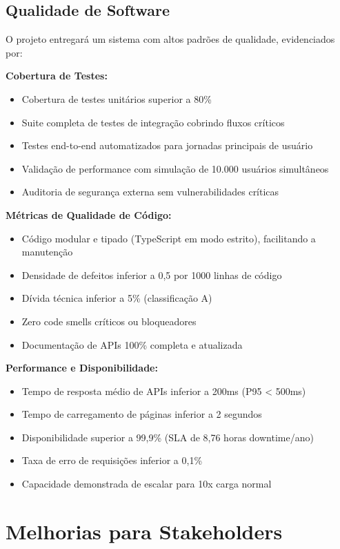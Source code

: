\subsection{Qualidade de Software}

O projeto entregará um sistema com altos padrões de qualidade, evidenciados por:

\textbf{Cobertura de Testes:}
\begin{itemize}
    \item Cobertura de testes unitários superior a 80\%
    \item Suite completa de testes de integração cobrindo fluxos críticos
    \item Testes end-to-end automatizados para jornadas principais de usuário
    \item Validação de performance com simulação de 10.000 usuários simultâneos
    \item Auditoria de segurança externa sem vulnerabilidades críticas
\end{itemize}

\textbf{Métricas de Qualidade de Código:}
\begin{itemize}
    \item Código modular e tipado (TypeScript em modo estrito), facilitando a manutenção
    \item Densidade de defeitos inferior a 0,5 por 1000 linhas de código
    \item Dívida técnica inferior a 5\% (classificação A)
    \item Zero code smells críticos ou bloqueadores
    \item Documentação de APIs 100\% completa e atualizada
\end{itemize}

\textbf{Performance e Disponibilidade:}
\begin{itemize}
    \item Tempo de resposta médio de APIs inferior a 200ms (P95 < 500ms)
    \item Tempo de carregamento de páginas inferior a 2 segundos
    \item Disponibilidade superior a 99,9\% (SLA de 8,76 horas downtime/ano)
    \item Taxa de erro de requisições inferior a 0,1\%
    \item Capacidade demonstrada de escalar para 10x carga normal
\end{itemize}

\section{Melhorias para Stakeholders}


